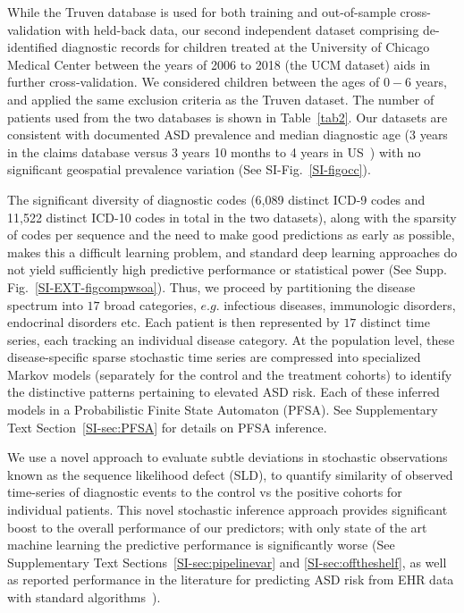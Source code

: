 \documentclass[onecolumn,,10pt]{IEEEtran}
\def\treatment{positive\xspace}
\begin{document}
While the Truven database is used for both training and out-of-sample cross-validation with held-back  data, our second independent dataset  comprising de-identified diagnostic records for children treated at the University of Chicago Medical Center between the years of 2006 to 2018 (the UCM dataset) aids in further cross-validation. We considered children between the ages of $0-6$ years, and  applied the same exclusion criteria as the Truven dataset.  The  number of  patients used from the two databases is shown in Table~\ref{tab2}. Our datasets are consistent with documented ASD prevalence and median diagnostic age (3 years in the claims database  versus 3 years 10 months to 4 years  in US~\cite{pmid29701730}) with no significant geospatial prevalence variation (See SI-Fig.~\ref{SI-figocc}).

The significant diversity of diagnostic codes (6,089 distinct ICD-9 codes and 11,522 distinct ICD-10 codes in total in the two datasets), along with the sparsity of codes per sequence and the need to make good predictions as early as possible,  makes this a difficult learning problem, and standard deep learning approaches do not yield sufficiently high predictive performance or statistical power (See Supp. Fig.~\ref{SI-EXT-figcompwsoa}). Thus, we proceed by  partitioning the  disease spectrum into $17 $ broad categories, $e.g.$ infectious diseases, immunologic disorders, endocrinal disorders etc. Each patient is then represented by $17$ distinct time series, each  tracking an individual disease category. At the population level, these disease-specific sparse stochastic time series are  compressed into specialized Markov models (separately for the control and the treatment cohorts) to identify  the distinctive patterns  pertaining to elevated ASD risk. Each of these inferred models in a Probabilistic Finite State Automaton (PFSA). See Supplementary Text Section~\ref{SI-sec:PFSA} for details on PFSA inference.  

We use a novel approach to evaluate subtle deviations in stochastic observations known as the sequence likelihood defect (SLD), to  quantify similarity of observed time-series of diagnostic events to the control vs the \treatment cohorts for individual patients. This novel stochastic inference approach provides  significant boost to the overall performance of our predictors; with only state of the art machine learning  the predictive performance is significantly worse (See Supplementary Text Sections~\ref{SI-sec:pipelinevar} and \ref{SI-sec:offtheshelf}, as well as reported performance in the literature for predicting ASD risk from EHR data with standard algorithms~\cite{lingren2016electronic}).
\end{document}
